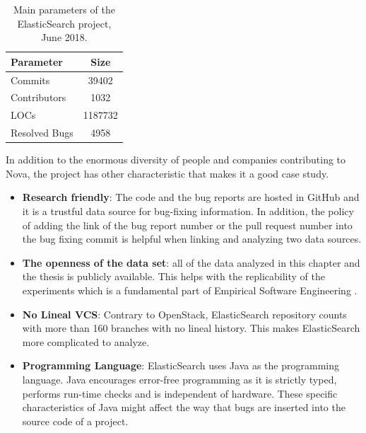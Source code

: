 \documentclass[a4paper, 12pt]{book}
\begin{document}
 \begin{table}[!t]
\renewcommand{\arraystretch}{0.8}
\caption{Main parameters of the ElasticSearch project, June 2018.}
\label{tableES}
\centering

\begin{tabular}{|l|c|}
\hline
Parameter & Size \\
\hline
\hline
Commits & 39402 \\
\hline
Contributors & 1032 \\
\hline
LOCs & 1187732\\
\hline
Resolved Bugs & 4958\\
\hline
\end{tabular}
\end{table}

In addition to the enormous diversity of people and companies contributing to Nova, the project has other characteristic that makes it a good case study.
\begin{itemize}
	\item \textbf{Research friendly}: The code and the bug reports are hosted in GitHub and it is a trustful data source for bug-fixing information. In addition, the policy of adding the link of the bug report number or the pull request number into the bug fixing commit is helpful when linking and analyzing two data sources.
	\item \textbf{The openness of the data set}: all of the data analyzed in this chapter and the thesis is publicly available. This helps with the replicability of the experiments which is a fundamental part of Empirical Software Engineering .
	\item \textbf{No Lineal VCS}: Contrary to OpenStack, ElasticSearch repository counts with more than 160 branches with no lineal history. This makes ElasticSearch more complicated to analyze.
	\item \textbf{Programming Language}: ElasticSearch uses Java as the programming language. Java encourages error-free programming as it is strictly typed, performs run-time checks and is independent of hardware. These specific characteristics of Java might affect the way that bugs are inserted into the source code of a project.
	\end{itemize}
\end{document}
